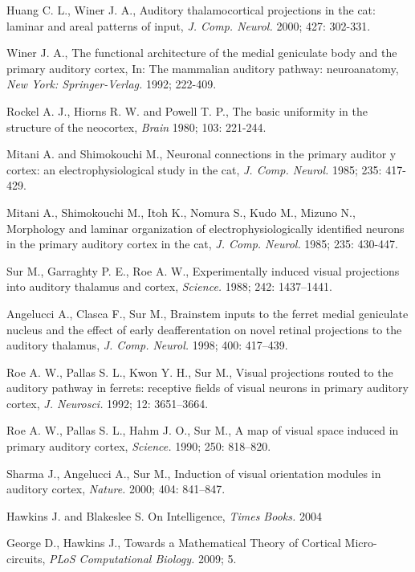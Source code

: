 \documentclass[11pt,a4paper]{article}
\begin{document}
\begin{thebibliography}{9}
  Huang C. L., Winer J. A.,
  Auditory thalamocortical projections in the cat: laminar and areal patterns of input,
  \emph{J. Comp. Neurol.} 2000; 427: 302-331.

  Winer J. A.,
  The functional architecture of the medial geniculate body and the primary auditory cortex,  In: The mammalian auditory pathway: neuroanatomy,
  \emph{New York: Springer-Verlag.} 1992; 222-409.

  Rockel A. J., Hiorns R. W. and Powell T. P.,
  The basic uniformity in the structure of the neocortex,
  \emph{Brain} 1980; 103: 221-244.

  Mitani A. and Shimokouchi M.,
  Neuronal connections in the primary auditor y cortex: an electrophysiological study in the cat,
  \emph{J. Comp. Neurol.} 1985; 235: 417-429.

  Mitani A., Shimokouchi M., Itoh K., Nomura S., Kudo M., Mizuno N.,
  Morphology and laminar organization of electrophysiologically identified neurons in the primary auditory cortex in the cat,
  \emph{J. Comp. Neurol.} 1985; 235: 430-447.

  Sur M., Garraghty P. E., Roe A. W.,
  Experimentally induced visual projections into auditory thalamus and cortex,
  \emph{Science.} 1988; 242: 1437–1441.

  Angelucci A., Clasca F., Sur M.,
  Brainstem inputs to the ferret medial geniculate nucleus and the effect of early deafferentation on novel retinal projections to the auditory thalamus,
  \emph{J. Comp. Neurol.} 1998; 400: 417–439.

  Roe A. W., Pallas S. L., Kwon Y. H., Sur M.,
  Visual projections routed to the auditory pathway in ferrets: receptive fields of visual neurons in primary auditory cortex,
  \emph{J. Neurosci.} 1992; 12: 3651–3664.

  Roe A. W., Pallas S. L., Hahm J. O., Sur M.,
  A map of visual space induced in primary auditory cortex,
  \emph{Science.} 1990; 250: 818–820.

  Sharma J., Angelucci A., Sur M.,
  Induction of visual orientation modules in auditory cortex,
  \emph{Nature.} 2000; 404: 841–847.

  Hawkins J. and Blakeslee S.
  On Intelligence,
  \emph{Times Books.} 2004

  George D., Hawkins J.,
  Towards a Mathematical Theory of Cortical Micro-circuits,
  \emph{PLoS Computational Biology.} 2009; 5.


\end{thebibliography}
\end{document}

